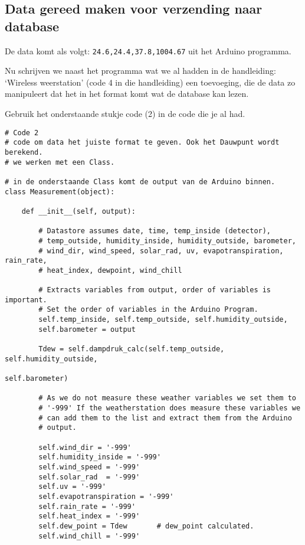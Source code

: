 \subsection{Data gereed maken voor verzending naar database}

De data komt als volgt: \verb|24.6,24.4,37.8,1004.67| uit het Arduino programma.

Nu schrijven we naast het programma wat we al hadden in de handleiding: `Wireless
weerstation' (code 4 in die handleiding) een toevoeging, die de data zo manipuleert dat het in het 
format komt wat de \hisparc database kan lezen.

Gebruik het onderstaande stukje code (2) in de code die je al had.

\begin{verbatim}
# Code 2
# code om data het juiste format te geven. Ook het Dauwpunt wordt berekend.
# we werken met een Class.

# in de onderstaande Class komt de output van de Arduino binnen.
class Measurement(object):

    def __init__(self, output):

        # Datastore assumes date, time, temp_inside (detector),
        # temp_outside, humidity_inside, humidity_outside, barometer,
        # wind_dir, wind_speed, solar_rad, uv, evapotranspiration, rain_rate, 
        # heat_index, dewpoint, wind_chill

        # Extracts variables from output, order of variables is important.
        # Set the order of variables in the Arduino Program.
        self.temp_inside, self.temp_outside, self.humidity_outside, 
        self.barometer = output

        Tdew = self.dampdruk_calc(self.temp_outside, self.humidity_outside, 
                                                            self.barometer)

        # As we do not measure these weather variables we set them to
        # '-999' If the weatherstation does measure these variables we
        # can add them to the list and extract them from the Arduino
        # output.

        self.wind_dir = '-999'
        self.humidity_inside = '-999'
        self.wind_speed = '-999'
        self.solar_rad  = '-999'
        self.uv = '-999'
        self.evapotranspiration = '-999'
        self.rain_rate = '-999'
        self.heat_index = '-999'
        self.dew_point = Tdew       # dew_point calculated.
        self.wind_chill = '-999'


\end{verbatim}
